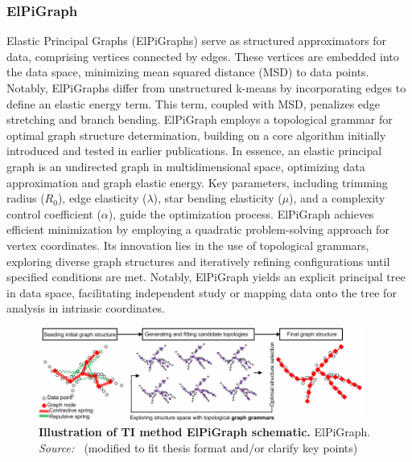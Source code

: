 \subsubsection{ElPiGraph}
 Elastic Principal Graphs (ElPiGraphs)\citep{albergante2020ElPiGraph} serve as structured approximators for data, comprising vertices connected by edges. These vertices are embedded into the data space, minimizing mean squared distance (MSD) to data points. Notably, ElPiGraphs differ from unstructured k-means by incorporating edges to define an elastic energy term. This term, coupled with MSD, penalizes edge stretching and branch bending. ElPiGraph employs a topological grammar for optimal graph structure determination, building on a core algorithm initially introduced and tested in earlier publications\citep{gorban2007topological}. In essence, an elastic principal graph is an undirected graph in multidimensional space, optimizing data approximation and graph elastic energy. Key parameters, including trimming radius ($R_0$), edge elasticity ($\lambda$), star bending elasticity ($\mu$), and a complexity control coefficient ($\alpha$), guide the optimization process. ElPiGraph achieves efficient minimization by employing a quadratic problem-solving approach for vertex coordinates. Its innovation lies in the use of topological grammars, exploring diverse graph structures and iteratively refining configurations until specified conditions are met. Notably, ElPiGraph yields an explicit principal tree in data space, facilitating independent study or mapping data onto the tree for analysis in intrinsic coordinates. 

 \begin{figure}[ht!]
	\centering
	\includegraphics[width=0.95\textwidth]{TI_Alg_ElPiGraph/fig}
	\vspace{0.1cm}
	\caption[Illustration of TI method ElPiGraph schematic.]{\textbf{Illustration of TI method ElPiGraph schematic.} ElPiGraph. \emph{Source: ~\cite{cao2019monocle3}}(modified to fit thesis format and/or clarify key points)
	}
	\label{fig:TI_Alg_ElPiGraph}
\end{figure}



